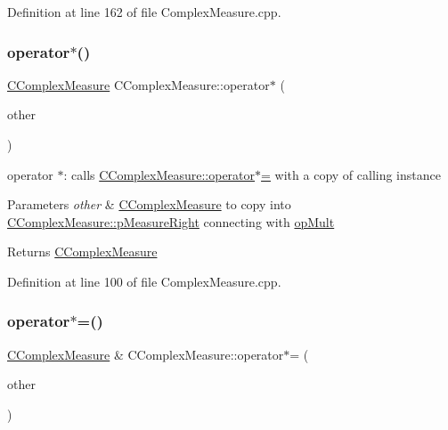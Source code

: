 Definition at line 162 of file Complex\+Measure.\+cpp.

\mbox{\label{classCComplexMeasure_afb04c59abf1f8ed44fe13d56df5d322c}} 
\subsubsection{\texorpdfstring{operator$\ast$()}{operator*()}}
{\footnotesize\ttfamily \hyperlink{classCComplexMeasure}{C\+Complex\+Measure} C\+Complex\+Measure\+::operator$\ast$ (\begin{DoxyParamCaption}\item[{const \hyperlink{classCComplexMeasure}{C\+Complex\+Measure} \&}]{other }\end{DoxyParamCaption})}



operator $\ast$\+: calls \hyperlink{classCComplexMeasure_a66de753c892ed0a82fa8f2eb4d98029d}{C\+Complex\+Measure\+::operator$\ast$=} with a copy of calling instance 


\begin{DoxyParams}{Parameters}
{\em other} & \hyperlink{classCComplexMeasure}{C\+Complex\+Measure} to copy into \hyperlink{classCComplexMeasure_abbafc4b16676d223ed34860b8ece1b6b}{C\+Complex\+Measure\+::p\+Measure\+Right} connecting with \hyperlink{MeasureOperator_8h_a1431c79e3ad4b4c5bcc9f31f188538f2ad474827f099ae98a2f2c92e1ef548eb2}{op\+Mult} \\
\hline
\end{DoxyParams}
\begin{DoxyReturn}{Returns}
\hyperlink{classCComplexMeasure}{C\+Complex\+Measure} 
\end{DoxyReturn}


Definition at line 100 of file Complex\+Measure.\+cpp.

\mbox{\label{classCComplexMeasure_a66de753c892ed0a82fa8f2eb4d98029d}} 
\subsubsection{\texorpdfstring{operator$\ast$=()}{operator*=()}}
{\footnotesize\ttfamily \hyperlink{classCComplexMeasure}{C\+Complex\+Measure} \& C\+Complex\+Measure\+::operator$\ast$= (\begin{DoxyParamCaption}\item[{const \hyperlink{classCComplexMeasure}{C\+Complex\+Measure} \&}]{other }\end{DoxyParamCaption})}



